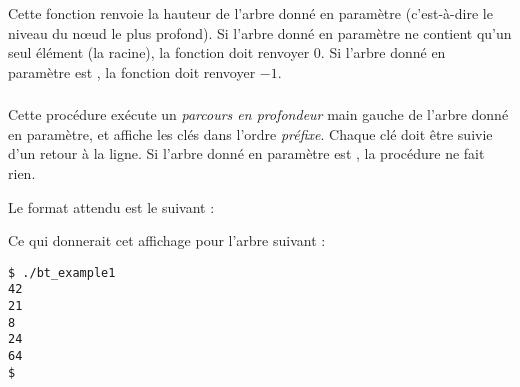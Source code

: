 \subsubsection*{}

\noindent Cette fonction renvoie la hauteur de l'arbre donné en paramètre (c'est-à-dire le niveau du nœud le plus profond).
Si l'arbre donné en paramètre ne contient qu'un seul élément (la racine), la fonction doit renvoyer $ 0 $.
Si l'arbre donné en paramètre est , la fonction doit renvoyer $ -1 $.

\bigskip


\subsubsection*{}

\noindent Cette procédure exécute un \textit{parcours en profondeur} main gauche de l'arbre donné en paramètre, et affiche les clés dans l'ordre \textit{préfixe}.
Chaque clé doit être suivie d'un retour à la ligne.
Si l'arbre donné en paramètre est , la procédure ne fait rien.

\noindent Le format attendu est le suivant :

\bigskip

\noindent {}

\bigskip

\noindent Ce qui donnerait cet affichage pour l'arbre suivant :

\begin{table}[ht!]
  \centering
  \begin{minipage}{0.45\textwidth}
    \centering

\lstset{language=sh}
\begin{lstlisting}[frame=single]
$ ./bt_example1
42
21
8
24
64
$
\end{lstlisting}

  \end{minipage}
  \hfillx
  \begin{minipage}{0.45\textwidth}
    \centering


  \end{minipage}
\end{table}

